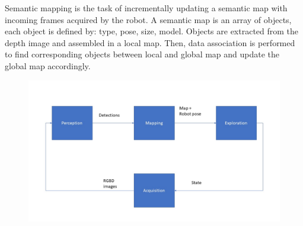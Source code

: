 \documentclass{article}
\begin{document}
%	
	Semantic mapping is the task of incrementally updating a semantic map with incoming frames acquired by the robot. A semantic map is an array of objects, each object is defined by: type, pose, size, model. Objects are extracted from the depth image and assembled in a local map. Then, data association is performed to find corresponding objects between local and global map and update the global map accordingly.
	
	 
    \begin{figure}[htbp]
		\centering
		\includegraphics[width=\linewidth]{pics/pipeline}
	\end{figure}	
	
	
	
	
	
\end{document}
